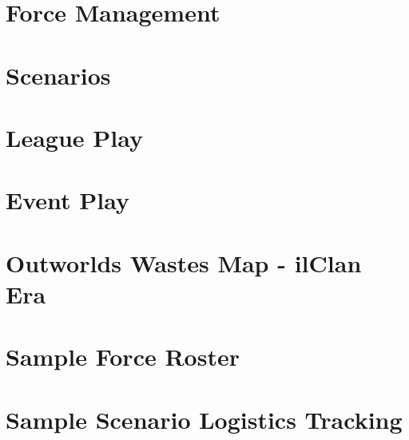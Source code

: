 \documentclass{article}
\newcommand{\mysectiontitle}{}
\newcommand{\newsection}[2]{\renewcommand{\mysectiontitle}{#2}\section{#1}}
\begin{document}


\newsection{Force Management}{force-management}



\newpage

\newsection{Scenarios}{scenarios}



\newpage

\newsection{League Play}{league-play}



\newpage

\newsection{Event Play}{event-play}



\newpage

\newsection{Outworlds Wastes Map - ilClan Era}{outworlds-wastes-map}



\newpage

\newsection{Sample Force Roster}{sample-force-roster}



\newpage

\newsection{Sample Scenario Logistics Tracking}{sample-logistics}
\end{document}
